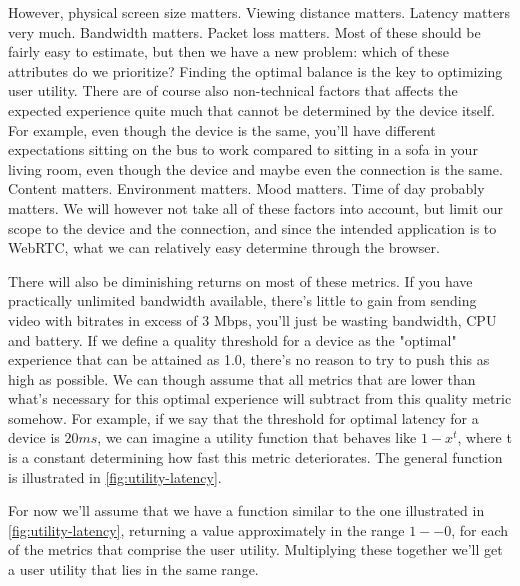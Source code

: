 However, physical screen size matters. Viewing distance matters. Latency matters very much. Bandwidth matters. Packet loss matters. Most of these should be fairly easy to estimate, but then we have a new problem: which of these attributes do we prioritize? Finding the optimal balance is the key to optimizing user utility. There are of course also non-technical factors that affects the expected experience quite much that cannot be determined by the device itself. For example, even though the device is the same, you'll have different expectations sitting on the bus to work compared to sitting in a sofa in your living room, even though the device and maybe even the connection is the same. Content matters. Environment matters. Mood matters. Time of day probably matters. We will however not take all of these factors into account, but limit our scope to the device and the connection, and since the intended application is to WebRTC, what we can relatively easy determine through the browser.

There will also be diminishing returns on most of these metrics. If you have practically unlimited bandwidth available, there's little to gain from sending video with bitrates in excess of 3 Mbps, you'll just be wasting bandwidth, CPU and battery. If we define a quality threshold for a device as the "optimal" experience that can be attained as 1.0, there's no reason to try to push this as high as possible. We can though assume that all metrics that are lower than what's necessary for this optimal experience will subtract from this quality metric somehow. For example, if we say that the threshold for optimal latency for a device is \(20ms\), we can imagine a \gls{utility function} that behaves like \(1 - x^t\), where t is a constant determining how fast this metric deteriorates. The general function is illustrated in \autoref{fig:utility-latency}.


For now we'll assume that we have a function similar to the one illustrated in \autoref{fig:utility-latency}, returning a value approximately in the range \(1 -- 0\), for each of the metrics that comprise the user utility. Multiplying these together we'll get a user utility that lies in the same range.


